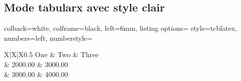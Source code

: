 \subsection{Mode tabularx avec style clair}
\begin{tcblisting}{
    colback=white,
    colframe=black,
    left=6mm,
    listing options={
        style=tcblatex,
        numbers=left,
        numberstyle=\tiny\color{red!75!black}
    }
}
\begin{tcbtabx}[My table]{X|X|X}{0.5\textwidth}
    One & Two & Three \\\hline{} & 2000.00 & 3000.00 \\ & 3000.00 & 4000.00
\end{tcbtabx}
\end{tcblisting}